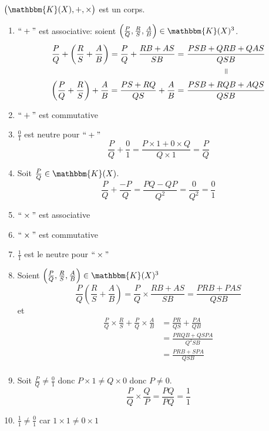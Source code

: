 \begin{thm}
	$\big(\mathbbm{K}(X), +, \times\big)$ est un corps.
\end{thm}

\begin{prv}
	[(partielle)]
	\begin{enumerate}
		\item $``+"$ est associative: soient $\left(\frac{P}{Q}, \frac{R}{S}, \frac{A}{B}\right) \in \mathbbm{K}(X)^3$.
			\begin{align*}
				\frac{P}{Q} + \left( \frac{R}{S} + \frac{A}{B} \right) = \frac{P}{Q} + \frac{RB+AS}{SB} = &~\frac{PSB + QRB + QAS}{QSB}\\
				&\quad\qquad\qquad\vrt=\\
				\left( \frac{P}{Q} + \frac{R}{S} \right) + \frac{A}{B} = \frac{PS+RQ}{QS} + \frac{A}{B} = &~\frac{PSB+ RQB + AQS}{QSB}
			\end{align*}
		\item $``+"$ est commutative
		\item $\frac{0}{1}$ est neutre pour $``+"$ 
			\[
				\frac{P}{Q} + \frac{0}{1} = \frac{P\times 1 + 0 \times Q}{Q \times 1} = \frac{P}{Q}
			\]
		\item Soit $\frac{P}{Q} \in \mathbbm{K}(X)$. \[
				\frac{P}{Q} + \frac{-P}{Q} = \frac{PQ - QP}{Q^2} = \frac{0}{Q^2} = \frac{0}{1}
			\]
		\item $``\times"$ est associative
		\item $``\times"$ est commutative
		\item $\frac{1}{1}$ est le neutre pour $``\times"$ 
		\item Soient $\left( \frac{P}{Q}, \frac{R}{S}, \frac{A}{B} \right) \in \mathbbm{K}(X)^3$
			\[
				\frac{P}{Q}\left( \frac{R}{S}+ \frac{A}{B} \right) = 
				\frac{P}{Q}\times \frac{RB+AS}{SB} = 
				\frac{PRB + PAS}{QSB}
			\] et
			\begin{align*}
				\frac{P}{Q} \times \frac{R}{S} + \frac{P}{Q} \times  \frac{A}{B} &= \frac{PR}{QS} + \frac{PA}{QB} \\
				&= \frac{PRQB + QSPA}{Q^2SB} \\
				&= \frac{PRB + SPA}{QSB} \\
			\end{align*}
		\item Soit $\frac{P}{Q} \neq \frac{0}{1}$ donc $P\times 1 \neq Q \times 0$ donc $P \neq 0$.
			\[
				\frac{P}{Q} \times \frac{Q}{P} = \frac{PQ}{PQ}= \frac{1}{1}
			\]
		\item $\frac{1}{1}\neq \frac{0}{1}$ car $1\times 1 \neq 0\times 1$
	\end{enumerate}
\end{prv}

